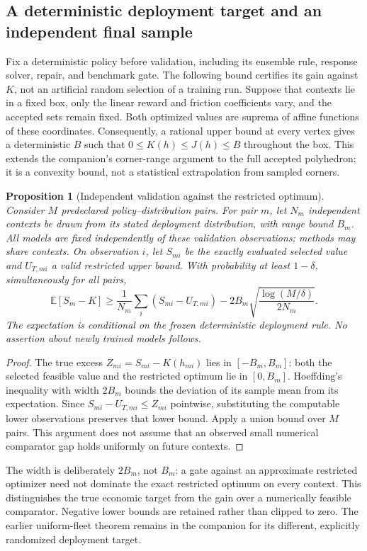\documentclass[11pt,letterpaper]{article}
\newtheorem{proposition}[theorem]{Proposition}
\theoremstyle{definition}
\newcommand{\E}{\mathbb E}
\newcommand{\1}{\mathbf 1}
\begin{document}
\subsection{A deterministic deployment target and an independent final sample}
Fix a deterministic policy before validation, including its ensemble rule, response solver, repair, and benchmark gate. The following bound certifies its gain against $K$, not an artificial random selection of a training run. Suppose that contexts lie in a fixed box, only the linear reward and friction coefficients vary, and the accepted sets remain fixed. Both optimized values are suprema of affine functions of these coordinates. Consequently, a rational upper bound at every vertex gives a deterministic $B$ such that
$0\leq K(h)\leq J(h)\leq B$ throughout the box. This extends the companion's corner-range argument to the full accepted polyhedron; it is a convexity bound, not a statistical extrapolation from sampled corners.

\begin{proposition}[Independent validation against the restricted optimum]\label{prop:r22-validation}
Consider $M$ predeclared policy--distribution pairs. For pair $m$, let $N_m$ independent contexts be drawn from its stated deployment distribution, with range bound $B_m$. All models are fixed independently of these validation observations; methods may share contexts. On observation $i$, let $S_{mi}$ be the exactly evaluated selected value and $U_{T,mi}$ a valid restricted upper bound. With probability at least $1-\delta$, simultaneously for all pairs,
\begin{equation}\label{eq:r22-validation}
 \E[S_m-K]\geq\frac1{N_m}\sum_i(S_{mi}-U_{T,mi})
 -2B_m\sqrt{\frac{\log(M/\delta)}{2N_m}}.
\end{equation}
The expectation is conditional on the frozen deterministic deployment rule. No assertion about newly trained models follows.
\end{proposition}
\begin{proof}
The true excess $Z_{mi}=S_{mi}-K(h_{mi})$ lies in $[-B_m,B_m]$: both the selected feasible value and the restricted optimum lie in $[0,B_m]$. Hoeffding's inequality with width $2B_m$ bounds the deviation of its sample mean from its expectation. Since $S_{mi}-U_{T,mi}\leq Z_{mi}$ pointwise, substituting the computable lower observations preserves that lower bound. Apply a union bound over $M$ pairs. This argument does not assume that an observed small numerical comparator gap holds uniformly on future contexts.
\end{proof}
The width is deliberately $2B_m$, not $B_m$: a gate against an approximate restricted optimizer need not dominate the exact restricted optimum on every context. This distinguishes the true economic target from the gain over a numerically feasible comparator. Negative lower bounds are retained rather than clipped to zero. The earlier uniform-fleet theorem remains in the companion for its different, explicitly randomized deployment target.
\end{document}
